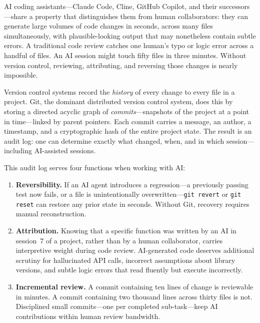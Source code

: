 \begin{context}
AI coding assistants---Claude Code, Cline, GitHub Copilot, and their
successors---share a property that distinguishes them from human collaborators:
they can generate large volumes of code changes in seconds, across many files
simultaneously, with plausible-looking output that may nonetheless contain
subtle errors.  A traditional code review catches one human's typo or logic
error across a handful of files.  An AI session might touch fifty files in
three minutes.  Without version control, reviewing, attributing, and reversing
those changes is nearly impossible.

Version control systems record the \emph{history} of every change to every
file in a project.  Git, the dominant distributed version control system,
does this by storing a directed acyclic graph of \emph{commits}---snapshots
of the project at a point in time---linked by parent pointers.  Each commit
carries a message, an author, a timestamp, and a cryptographic hash of the
entire project state.  The result is an audit log: one can determine exactly
what changed, when, and in which session---including AI-assisted sessions.

This audit log serves four functions when working with AI:

\begin{enumerate}
  \item \textbf{Reversibility.}  If an AI agent introduces a regression---a
        previously passing test now fails, or a file is unintentionally
        overwritten---\texttt{git revert} or \texttt{git reset} can restore
        any prior state in seconds.  Without Git, recovery requires manual
        reconstruction.

  \item \textbf{Attribution.}  Knowing that a specific function was written
        by an AI in session~7 of a project, rather than by a human collaborator,
        carries interpretive weight during code review.  AI-generated code
        deserves additional scrutiny for hallucinated API calls, incorrect
        assumptions about library versions, and subtle logic errors that read
        fluently but execute incorrectly.

  \item \textbf{Incremental review.}  A commit containing ten lines of change
        is reviewable in minutes.  A commit containing two thousand lines across
        thirty files is not.  Disciplined small commits---one per completed
        sub-task---keep AI contributions within human review bandwidth.


\end{enumerate}
\end{context}
